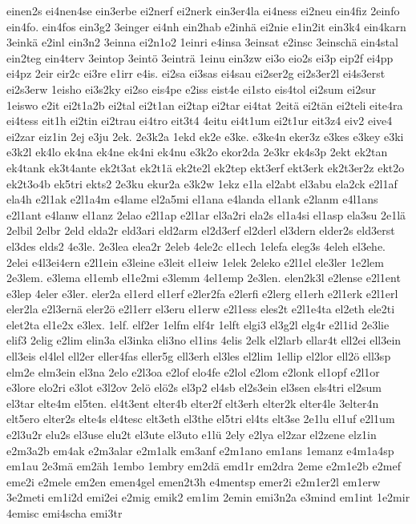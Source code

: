{einen2s
ei4nen4se
ein3erbe
ei2nerf
ei2nerk
ein3er4la
ei4ness
ei2neu
ein4fiz
2einfo
ein4fo.
ein4fos
ein3g2
3einger
ei4nh
ein2hab
e2inhä
ei2nie
e1in2it
ein3k4
ein4karn
3einkä
e2inl
ein3n2
3einna
ei2n1o2
1einri
e4insa
3einsat
e2insc
3einschä
ein4stal
ein2teg
ein4terv
3eintop
3eintö
3einträ
1einu
ein3zw
ei3o
eio2s
ei3p
eip2f
ei4pp
ei4pz
2eir
eir2c
ei3re
e1irr
e4is.
ei2sa
ei3sas
ei4sau
ei2ser2g
ei2s3er2l
ei4s3erst
ei2s3erw
1eisho
ei3s2ky
ei2so
eis4pe
e2iss
eist4e
ei1sto
eis4tol
ei2sum
ei2sur
1eiswo
e2it
ei2t1a2b
ei2tal
ei2t1an
ei2tap
ei2tar
ei4tat
2eitä
ei2tän
ei2teli
eite4ra
ei4tess
eit1h
ei2tin
ei2trau
ei4tro
eit3t4
4eitu
ei4t1um
ei2t1ur
eit3z4
eiv2
eive4
ei2zar
eiz1in
2ej
e3ju
2ek.
2e3k2a
1ekd
ek2e
e3ke.
e3ke4n
eker3z
e3kes
e3key
e3ki
e3k2l
ek4lo
ek4na
ek4ne
ek4ni
ek4nu
e3k2o
ekor2da
2e3kr
ek4s3p
2ekt
ek2tan
ek4tank
ek3t4ante
ek2t3at
ek2t1ä
ek2te2l
ek2tep
ekt3erf
ekt3erk
ek2t3er2z
ekt2o
ek2t3o4b
ek5tri
ekts2
2e3ku
ekur2a
e3k2w
1ekz
e1la
el2abt
el3abu
ela2ck
e2l1af
ela4h
e2l1ak
e2l1a4m
e4lame
el2a5mi
el1ana
e4landa
el1ank
e2lanm
e4l1ans
e2l1ant
e4lanw
el1anz
2elao
e2l1ap
e2l1ar
el3a2ri
ela2s
el1a4si
el1asp
ela3su
2e1lä
2elbil
2elbr
2eld
elda2r
eld3ari
eld2arm
el2d3erf
el2derl
el3dern
elder2s
eld3erst
el3des
elds2
4e3le.
2e3lea
elea2r
2eleb
4ele2c
el1ech
1elefa
eleg3s
4eleh
el3ehe.
2elei
e4l3ei4ern
e2l1ein
e3leine
e3leit
el1eiw
1elek
2eleko
e2l1el
ele3ler
1e2lem
2e3lem.
e3lema
el1emb
el1e2mi
e3lemm
4el1emp
2e3len.
elen2k3l
e2lense
e2l1ent
e3lep
4eler
e3ler.
eler2a
el1erd
el1erf
e2ler2fa
e2lerfi
e2lerg
el1erh
e2l1erk
e2l1erl
eler2la
e2l3ernä
eler2ö
e2l1err
el3eru
el1erw
e2l1ess
eles2t
e2l1e4ta
el2eth
ele2ti
elet2ta
el1e2x
e3lex.
1elf.
elf2er
1elfm
elf4r
1elft
elgi3
el3g2l
elg4r
e2l1id
2e3lie
elif3
2elig
e2lim
elin3a
el3inka
eli3no
el1ins
4elis
2elk
el2larb
ellar4t
ell2ei
ell3ein
ell3eis
el4lel
ell2er
eller4fas
eller5g
ell3erh
el3les
el2lim
1ellip
el2lor
ell2ö
ell3sp
elm2e
elm3ein
el3na
2elo
e2l3oa
e2lof
elo4fe
e2lol
e2lom
e2lonk
el1opf
e2l1or
e3lore
elo2ri
e3lot
e3l2ov
2elö
elö2s
el3p2
el4sb
el2s3ein
el3sen
els4tri
el2sum
el3tar
elte4m
el5ten.
el4t3ent
elter4b
elter2f
elt3erh
elter2k
elter4le
3elter4n
elt5ero
elter2s
elte4s
el4tesc
elt3eth
el3the
el5tri
el4ts
elt3se
2e1lu
el1uf
e2l1um
e2l3u2r
elu2s
el3use
elu2t
el3ute
el3uto
e1lü
2ely
e2lya
el2zar
el2zene
elz1in
e2m3a2b
em4ak
e2m3alar
e2m1alk
em3anf
e2m1ano
em1ans
1emanz
e4m1a4sp
em1au
2e3mä
em2äh
1embo
1embry
em2dä
emd1r
em2dra
2eme
e2m1e2b
e2mef
eme2i
e2mele
em2en
emen4gel
emen2t3h
e4mentsp
emer2i
e2m1er2l
em1erw
3e2meti
em1i2d
emi2ei
e2mig
emik2
em1im
2emin
emi3n2a
e3mind
em1int
1e2mir
4emisc
emi4scha
emi3tr
}
